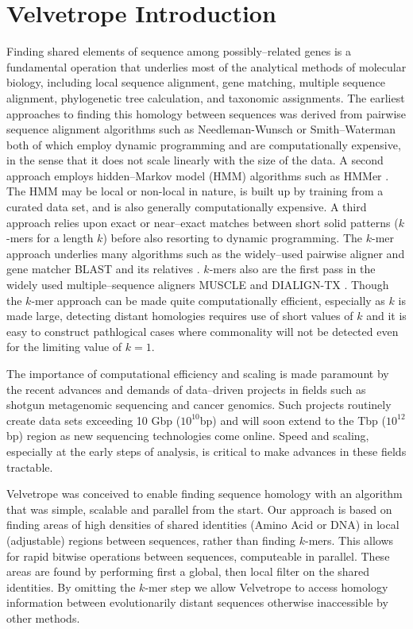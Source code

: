 \documentclass[phd,tocprelim]{cornell}
\begin{document}
\chapter{Velvetrope Introduction} %
\label{cha:Velvetrope Introduction}

Finding shared elements of sequence among possibly--related genes is a
fundamental operation that underlies most of the analytical methods of
molecular biology, including local sequence alignment, gene matching,
multiple sequence alignment, phylogenetic tree calculation, and
taxonomic assignments. The earliest approaches to finding this homology
between sequences was derived from pairwise sequence alignment algorithms
such as Needleman-Wunsch \cite{Needleman70} or Smith--Waterman
\cite{SmithWaterman} both of which employ dynamic programming and
are computationally expensive, in the sense that it does not scale linearly with the size of the data. A second approach employs
hidden--Markov model (HMM) algorithms such as HMMer
\cite{Eddy98}. The HMM may be local or non-local in nature, is
built up by training from a curated data set, and is also generally
computationally expensive. A third approach relies upon exact or
near--exact matches between short solid patterns ($k$-mers for a length $k$) before also resorting to dynamic programming.  The
$k$-mer approach underlies many algorithms such as the widely--used
pairwise aligner and gene matcher BLAST \cite{BLAST} and its
relatives \cite{BLAT,Megablast,PSIBLAST}. $k$-mers also are the first pass in the widely used multiple--sequence aligners
MUSCLE \cite{MUSCLE} and DIALIGN-TX \cite{DIALIGN-TX}. Though the $k$-mer approach can be made quite computationally
efficient, especially as $k$ is made large, detecting distant
homologies requires use of short values of $k$ and it is easy to
construct pathlogical cases where commonality will not be detected
even for the limiting value of $k = 1$.

The importance of computational efficiency and scaling is made paramount by the recent advances
and demands of data--driven projects in fields such as
shotgun metagenomic sequencing and cancer genomics. Such projects
routinely create data sets exceeding 10 Gbp ($10^{10}$bp) and will soon extend
to the Tbp ($10^{12}$bp) region as new sequencing technologies come online. Speed
and scaling, especially at the early steps of analysis, is critical to make advances in these fields tractable.

Velvetrope was conceived to enable finding sequence homology with an algorithm that
was simple, scalable and parallel from the start. Our approach is based on finding areas of high densities of shared identities (Amino Acid or DNA) in local
(adjustable) regions between sequences, rather than finding $k$-mers. This allows for rapid bitwise operations between sequences, computeable in parallel. These areas are found by performing first a global, then local filter on the shared identities. By omitting the $k$-mer step we allow Velvetrope to access homology information between evolutionarily distant sequences otherwise inaccessible by other methods.
\end{document}

